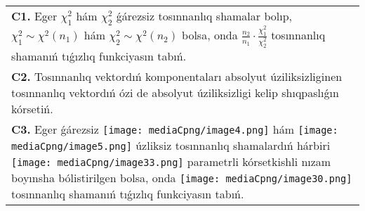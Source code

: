 \documentclass{article}
\begin{document}
\begin{tabular}{m{17cm}}
 \\
\textbf{C1.} Eger \(\chi_{1}^{2}\) hám \(\chi_{2}^{2}\) ǵárezsiz tosınnanlıq shamalar bolıp, \(\chi_{1}^{2}\sim\chi^{2}(n_{1})\) hám \(\chi_{2}^{2}\sim\chi^{2}(n_{2})\) bolsa, onda \(\frac{n_{2}}{n_{1}} \cdot \frac{\chi_{1}^{2}}{\chi_{2}^{2}}\) tosınnanlıq shamanıń tıǵızlıq funkciyasın tabıń.
 \\
\textbf{C2.} Tosınnanlıq vektordıń komponentaları absolyut úziliksizliginen tosınnanlıq vektordıń ózi de absolyut úziliksizligi kelip shıqpaslıǵın kórsetiń.
 \\
\textbf{C3.} Eger ǵárezsiz \texttt{[image: mediaCpng/image4.png]} hám \texttt{[image: mediaCpng/image5.png]} úzliksiz tosınnanlıq shamalardıń hárbiri \texttt{[image: mediaCpng/image33.png]} parametrli kórsetkishli nızam boyınsha bólistirilgen bolsa, onda \texttt{[image: mediaCpng/image30.png]} tosınnanlıq shamanıń tıǵızlıq funkciyasın tabıń.
 \\

\end{tabular}
\vspace{1cm}
\end{document}
